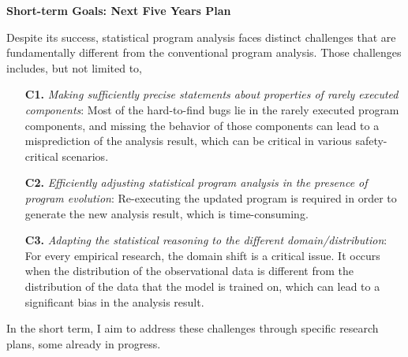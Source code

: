 \documentclass{article}
\begin{document}

\vspace{0.5em}
\noindent\textbf{Short-term Goals: Next Five Years Plan}
\vspace{0.5em}

\noindent 

\noindent Despite its success, statistical program analysis faces distinct challenges that are fundamentally different from the conventional program analysis. Those challenges includes, but not limited to, 
\begin{itemize}[leftmargin=20pt, topsep=2pt, parsep=0pt, partopsep=0pt, label={-}]
  \item[\textbf{C1.}] \emph{Making sufficiently precise statements about properties of rarely executed components}: Most of the hard-to-find bugs lie in the rarely executed program components, and missing the behavior of those components can lead to a misprediction of the analysis result, which can be critical in various safety-critical scenarios.
  \item[\textbf{C2.}] \emph{Efficiently adjusting statistical program analysis in the presence of program evolution}: Re-executing the updated program is required in order to generate the new analysis result, which is time-consuming.
  \item[\textbf{C3.}] \emph{Adapting the statistical reasoning to the different domain/distribution}: For every empirical research, the domain shift is a critical issue. It occurs when the distribution of the observational data is different from the distribution of the data that the model is trained on, which can lead to a significant bias in the analysis result.
\end{itemize}
In the short term, I aim to address these challenges through specific research plans, some already in progress.
\end{document}

